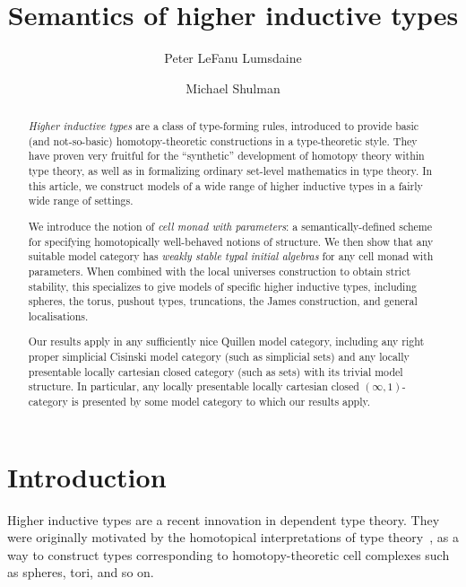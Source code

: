\documentclass{amsart}
\title{Semantics of higher inductive types}
\author{Peter LeFanu Lumsdaine}
\author{Michael Shulman}
\begin{document}
\maketitle

\begin{abstract}
  \emph{Higher inductive types} are a class of type-forming rules, introduced to provide basic (and not-so-basic) homotopy-theoretic constructions in a type-theoretic style.
  They have proven very fruitful for the ``synthetic'' development of homotopy theory within type theory, as well as in formalizing ordinary set-level mathematics in type theory.
  In this article, we construct models of a wide range of higher inductive types in a fairly wide range of settings.
  
  We introduce the notion of \emph{cell monad with parameters}: a semantically-defined scheme for specifying homotopically well-behaved notions of structure.
  We then show that any suitable model category has \emph{weakly stable typal initial algebras} for any cell monad with parameters.
  When combined with the local universes construction to obtain strict stability, this specializes to give models of specific higher inductive types, including spheres, the torus, pushout types, truncations, the James construction, and general localisations.

  Our results apply in any sufficiently nice Quillen model category, including any right proper simplicial Cisinski model category (such as simplicial sets) and any locally presentable locally cartesian closed category (such as sets) with its trivial model structure.
  In particular, any locally presentable locally cartesian closed $(\infty,1)$-category is presented by some model category to which our results apply.
\end{abstract}

\tableofcontents

\section{Introduction}
\label{sec:introduction}

Higher inductive types are a recent innovation in dependent type theory.
They were originally motivated by the homotopical interpretations of type theory~\cite{aw:htpy-idtype,klv:ssetmodel,hottbook}, as a way to construct types corresponding to homotopy-theoretic cell complexes such as spheres, tori, and so on.
\end{document}
